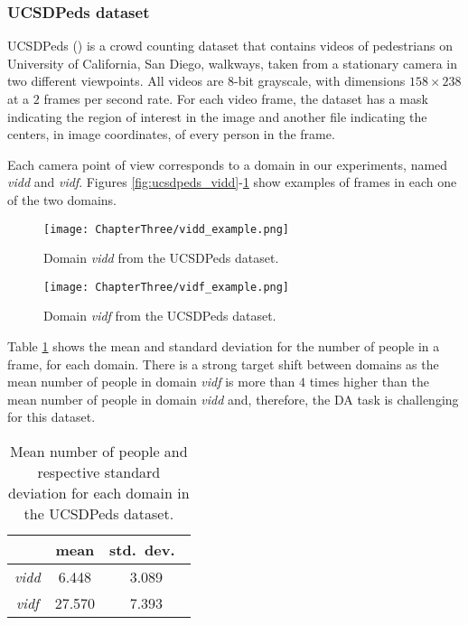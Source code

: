 \subsubsection{UCSDPeds dataset}
\label{sec:da_sensors_ucsdpeds}

UCSDPeds (\citet{Chan2008}) is a crowd counting dataset that contains videos of pedestrians on University of California, San Diego, walkways, taken from a stationary camera in two different viewpoints. All videos are 8-bit grayscale, with dimensions $158 \times 238$ at a $2$ frames per second rate. For each video frame, the dataset has a mask indicating the region of interest in the image and another file indicating the centers, in image coordinates, of every person in the frame. 

Each camera point of view corresponds to a domain in our experiments, named \textit{vidd} and \textit{vidf}. Figures \ref{fig:ucsdpeds_vidd}-\ref{fig:ucsdpeds_vidf} show examples of frames in each one of the two domains.

\begin{figure}[!ht]
	\centering
	\begin{minipage}[b]{0.4\textwidth}
		\texttt{[image: ChapterThree/vidd\_example.png]}
		\caption{Domain \textit{vidd} from the UCSDPeds dataset.}
		\label{fig:ucsdpeds_vidd}
	\end{minipage}
	\hfill
	\begin{minipage}[b]{0.4\textwidth}
		\texttt{[image: ChapterThree/vidf\_example.png]}
		\caption{Domain \textit{vidf} from the UCSDPeds dataset.}
		\label{fig:ucsdpeds_vidf}
	\end{minipage} 
\end{figure}

Table \ref{tab:ucsdpeds_domains} shows the mean and standard deviation for the number of people in a frame, for each domain. There is a strong target shift between domains as the mean number of people in domain \textit{vidf} is more than $4$ times higher than the mean number of people in domain \textit{vidd} and, therefore, the DA task is challenging for this dataset.

\begin{table}[!ht]
	\centering
	\begin{tabular}{c| c c}
		 & mean & std.\ dev.\  \\
		\hline
		\textit{vidd} & 6.448 & 3.089\\
		\textit{vidf} & 27.570 & 7.393 \\
	\end{tabular}
	\caption{Mean number of people and respective standard deviation for each domain in the UCSDPeds dataset.}
	\label{tab:ucsdpeds_domains}
\end{table}

